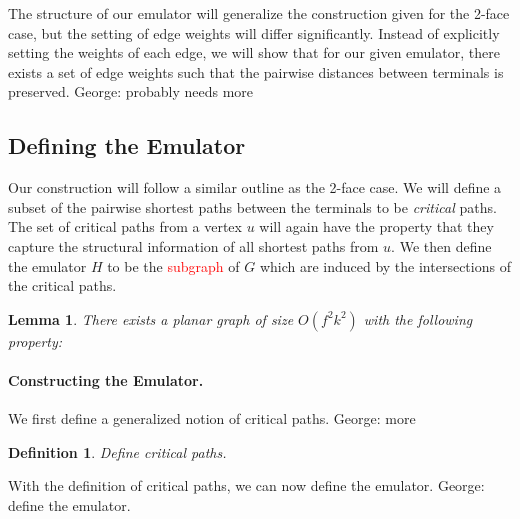 \documentclass[11pt]{article}
\newcommand{\george}[1]{{\color{green} George: #1}}
\newcommand{\tianyi}[1]{{\color{purple} Tianyi: #1}}
\newtheorem{lemma}[theorem]{Lemma}
\newtheorem{claim}[theorem]{Claim}
\newtheorem{definition}[theorem]{Definition}
\begin{document}

\iffalse
The structure of our emulator will generalize the construction given for the 2-face case, but the setting of edge weights will differ significantly. Instead of explicitly setting the weights of each edge, we will show that for our given emulator, there exists a set of edge weights such that the pairwise distances between terminals is preserved. \george{probably needs more}


\subsection{Defining the Emulator}

Our construction will follow a similar outline as the 2-face case. We will define a subset of the pairwise shortest paths between the terminals to be \emph{critical} paths. The set of critical paths from a vertex $u$ will again have the property that they capture the structural information of all shortest paths from $u$. We then define the emulator $H$ to be the \textcolor{red}{subgraph} of $G$ which are induced by the intersections of the critical paths. 

\begin{lemma}
    There exists a planar graph of size $O(f^2k^2)$ with the following property:
\end{lemma}

\paragraph{Constructing the Emulator.} 
We first define a generalized notion of critical paths. \george{more}

\begin{definition}
    Define critical paths.
\end{definition}

With the definition of critical paths, we can now define the emulator. \george{define the emulator.}
\end{document}
